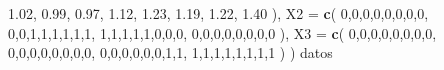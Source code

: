 \documentclass[
]{book}
\newenvironment{Shaded}{\begin{snugshade}}{\end{snugshade}}
\newcommand{\AttributeTok}[1]{\textcolor[rgb]{0.13,0.29,0.53}{#1}}
\newcommand{\DecValTok}[1]{\textcolor[rgb]{0.00,0.00,0.81}{#1}}
\newcommand{\FloatTok}[1]{\textcolor[rgb]{0.00,0.00,0.81}{#1}}
\newcommand{\FunctionTok}[1]{\textcolor[rgb]{0.13,0.29,0.53}{\textbf{#1}}}
\newcommand{\NormalTok}[1]{#1}
\begin{document}
\begin{Shaded}
\begin{Highlighting}[]
    \FloatTok{1.02}\NormalTok{, }\FloatTok{0.99}\NormalTok{, }\FloatTok{0.97}\NormalTok{, }\FloatTok{1.12}\NormalTok{, }\FloatTok{1.23}\NormalTok{, }\FloatTok{1.19}\NormalTok{, }\FloatTok{1.22}\NormalTok{, }\FloatTok{1.40}
\NormalTok{  ),}
  \AttributeTok{X2 =} \FunctionTok{c}\NormalTok{(}
    \DecValTok{0}\NormalTok{,}\DecValTok{0}\NormalTok{,}\DecValTok{0}\NormalTok{,}\DecValTok{0}\NormalTok{,}\DecValTok{0}\NormalTok{,}\DecValTok{0}\NormalTok{,}\DecValTok{0}\NormalTok{,}\DecValTok{0}\NormalTok{,}
    \DecValTok{0}\NormalTok{,}\DecValTok{0}\NormalTok{,}\DecValTok{1}\NormalTok{,}\DecValTok{1}\NormalTok{,}\DecValTok{1}\NormalTok{,}\DecValTok{1}\NormalTok{,}\DecValTok{1}\NormalTok{,}\DecValTok{1}\NormalTok{,}
    \DecValTok{1}\NormalTok{,}\DecValTok{1}\NormalTok{,}\DecValTok{1}\NormalTok{,}\DecValTok{1}\NormalTok{,}\DecValTok{1}\NormalTok{,}\DecValTok{0}\NormalTok{,}\DecValTok{0}\NormalTok{,}\DecValTok{0}\NormalTok{,}
    \DecValTok{0}\NormalTok{,}\DecValTok{0}\NormalTok{,}\DecValTok{0}\NormalTok{,}\DecValTok{0}\NormalTok{,}\DecValTok{0}\NormalTok{,}\DecValTok{0}\NormalTok{,}\DecValTok{0}\NormalTok{,}\DecValTok{0}
\NormalTok{  ),}
  \AttributeTok{X3 =} \FunctionTok{c}\NormalTok{(}
    \DecValTok{0}\NormalTok{,}\DecValTok{0}\NormalTok{,}\DecValTok{0}\NormalTok{,}\DecValTok{0}\NormalTok{,}\DecValTok{0}\NormalTok{,}\DecValTok{0}\NormalTok{,}\DecValTok{0}\NormalTok{,}\DecValTok{0}\NormalTok{,}
    \DecValTok{0}\NormalTok{,}\DecValTok{0}\NormalTok{,}\DecValTok{0}\NormalTok{,}\DecValTok{0}\NormalTok{,}\DecValTok{0}\NormalTok{,}\DecValTok{0}\NormalTok{,}\DecValTok{0}\NormalTok{,}\DecValTok{0}\NormalTok{,}
    \DecValTok{0}\NormalTok{,}\DecValTok{0}\NormalTok{,}\DecValTok{0}\NormalTok{,}\DecValTok{0}\NormalTok{,}\DecValTok{0}\NormalTok{,}\DecValTok{0}\NormalTok{,}\DecValTok{1}\NormalTok{,}\DecValTok{1}\NormalTok{,}
    \DecValTok{1}\NormalTok{,}\DecValTok{1}\NormalTok{,}\DecValTok{1}\NormalTok{,}\DecValTok{1}\NormalTok{,}\DecValTok{1}\NormalTok{,}\DecValTok{1}\NormalTok{,}\DecValTok{1}\NormalTok{,}\DecValTok{1}
\NormalTok{  )}
\NormalTok{)}
\NormalTok{datos}
\end{Highlighting}
\end{Shaded}
\end{document}
